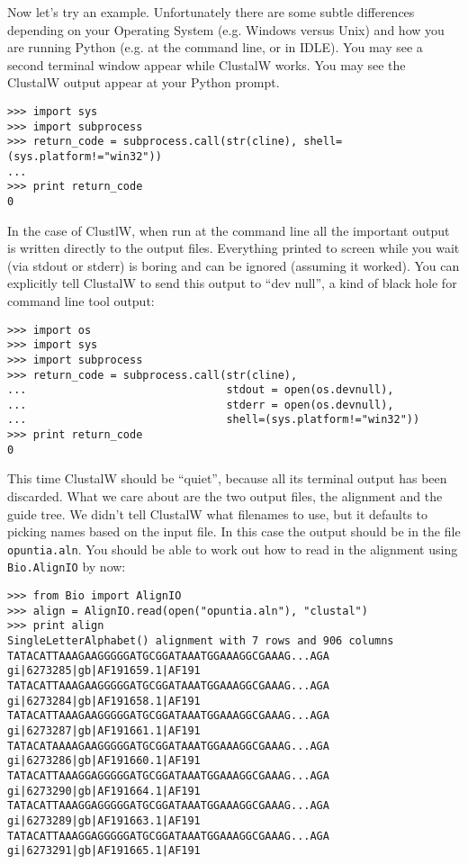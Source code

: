 \documentclass{report}
\begin{document}
Now let's try an example. Unfortunately there are some subtle differences
depending on your Operating System (e.g. Windows versus Unix) and how you
are running Python (e.g. at the command line, or in IDLE). You may see a
second terminal window appear while ClustalW works. You may see the
ClustalW output appear at your Python prompt.

\begin{verbatim}
>>> import sys
>>> import subprocess
>>> return_code = subprocess.call(str(cline), shell=(sys.platform!="win32"))
...
>>> print return_code
0
\end{verbatim}

In the case of ClustlW, when run at the command line all the important
output is written directly to the output files. Everything printed to
screen while you wait (via stdout or stderr) is boring and can be
ignored (assuming it worked).  You can explicitly tell ClustalW to send
this output to ``dev null'', a kind of black hole for command line tool output:

\begin{verbatim}
>>> import os
>>> import sys
>>> import subprocess
>>> return_code = subprocess.call(str(cline),
...                               stdout = open(os.devnull),
...                               stderr = open(os.devnull),
...                               shell=(sys.platform!="win32"))
>>> print return_code
0
\end{verbatim}

This time ClustalW should be ``quiet'', because all its terminal output
has been discarded.
What we care about are the two output files, the alignment and the guide
tree. We didn't tell ClustalW what filenames to use, but it defaults to
picking names based on the input file. In this case the output should be
in the file \verb|opuntia.aln|.
You should be able to work out how to read in the alignment using
\verb|Bio.AlignIO| by now:

\begin{verbatim}
>>> from Bio import AlignIO
>>> align = AlignIO.read(open("opuntia.aln"), "clustal")
>>> print align
SingleLetterAlphabet() alignment with 7 rows and 906 columns
TATACATTAAAGAAGGGGGATGCGGATAAATGGAAAGGCGAAAG...AGA gi|6273285|gb|AF191659.1|AF191
TATACATTAAAGAAGGGGGATGCGGATAAATGGAAAGGCGAAAG...AGA gi|6273284|gb|AF191658.1|AF191
TATACATTAAAGAAGGGGGATGCGGATAAATGGAAAGGCGAAAG...AGA gi|6273287|gb|AF191661.1|AF191
TATACATAAAAGAAGGGGGATGCGGATAAATGGAAAGGCGAAAG...AGA gi|6273286|gb|AF191660.1|AF191
TATACATTAAAGGAGGGGGATGCGGATAAATGGAAAGGCGAAAG...AGA gi|6273290|gb|AF191664.1|AF191
TATACATTAAAGGAGGGGGATGCGGATAAATGGAAAGGCGAAAG...AGA gi|6273289|gb|AF191663.1|AF191
TATACATTAAAGGAGGGGGATGCGGATAAATGGAAAGGCGAAAG...AGA gi|6273291|gb|AF191665.1|AF191
\end{verbatim}
\end{document}
